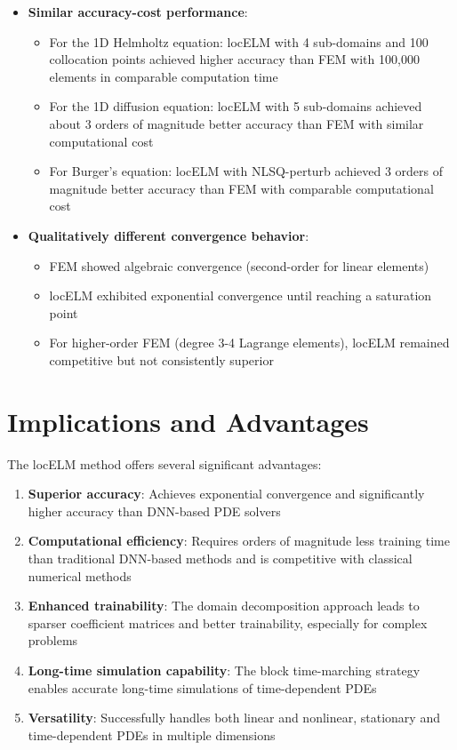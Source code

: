 \documentclass[11pt,a4paper]{article}
\begin{document}
\begin{itemize}
    \item \textbf{Similar accuracy-cost performance}:
    \begin{itemize}
        \item For the 1D Helmholtz equation: locELM with 4 sub-domains and 100 collocation points achieved higher accuracy than FEM with 100,000 elements in comparable computation time
        \item For the 1D diffusion equation: locELM with 5 sub-domains achieved about 3 orders of magnitude better accuracy than FEM with similar computational cost
        \item For Burger's equation: locELM with NLSQ-perturb achieved 3 orders of magnitude better accuracy than FEM with comparable computational cost
    \end{itemize}
    
    \item \textbf{Qualitatively different convergence behavior}:
    \begin{itemize}
        \item FEM showed algebraic convergence (second-order for linear elements)
        \item locELM exhibited exponential convergence until reaching a saturation point
        \item For higher-order FEM (degree 3-4 Lagrange elements), locELM remained competitive but not consistently superior
    \end{itemize}
\end{itemize}

\section{Implications and Advantages}

The locELM method offers several significant advantages:

\begin{enumerate}
    \item \textbf{Superior accuracy}: Achieves exponential convergence and significantly higher accuracy than DNN-based PDE solvers
    
    \item \textbf{Computational efficiency}: Requires orders of magnitude less training time than traditional DNN-based methods and is competitive with classical numerical methods
    
    \item \textbf{Enhanced trainability}: The domain decomposition approach leads to sparser coefficient matrices and better trainability, especially for complex problems
    
    \item \textbf{Long-time simulation capability}: The block time-marching strategy enables accurate long-time simulations of time-dependent PDEs
    
    \item \textbf{Versatility}: Successfully handles both linear and nonlinear, stationary and time-dependent PDEs in multiple dimensions
\end{enumerate}
\end{document}
